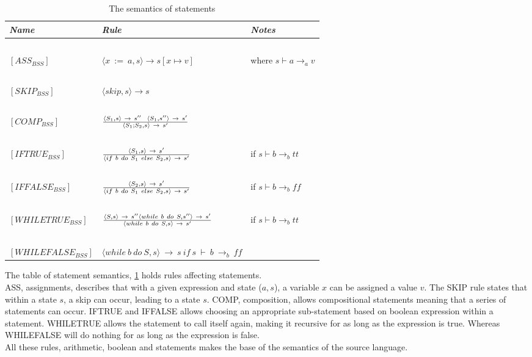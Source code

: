 \begin{table}[H]
	\begin{tabular}{|l|l|l|}
	\hline
	\emph{Name}			& \emph{Rule}																															& \emph{Notes} \\ \hline
			~			&															~																			& ~ \\
	$[ASS_{BSS}]$		& $\langle x~:=~a,s \rangle \rightarrow s[x \mapsto v]$																					& where $s \vdash a \rightarrow_{a} v$ \\
			~			&															~																			& ~ \\
	$[SKIP_{BSS}]$		& $\langle skip, s \rangle \rightarrow s$																								& ~ \\
			~			&															~																			& ~ \\
	$[COMP_{BSS}]$		& $\langle S_{1},s \rangle~\rightarrow~s''~~\langle S_{1},s'' \rangle~\rightarrow~s'  \over \langle S_{1};S_{2},s \rangle~\rightarrow~s'$	& ~ \\
			~			&															~																			& ~ \\
	$[IFTRUE_{BSS}]$	& $\langle S_{1},s \rangle~\rightarrow~s' \over \langle if~b~do~S_{1}~else~S_{2},s \rangle~\rightarrow~s'	$							& if $s \vdash b \rightarrow_{b} tt$\\
			~			&															~																			& ~ \\
	$[IFFALSE_{BSS}]$	& $\langle S_{2},s \rangle~\rightarrow~s' \over \langle if~b~do~S_{1}~else~S_{2},s \rangle~\rightarrow~s'	$							& if $s \vdash b \rightarrow_{b} ff$\\
			~			&															~																			& ~ \\
	$[WHILETRUE_{BSS}]$	& $\langle S,s \rangle~\rightarrow~s'' \langle while~b~do~S,s'' \rangle~\rightarrow~s' \over \langle while~b~do~S,s \rangle~\rightarrow~s'	$ & if $s \vdash b \rightarrow_{b} tt$\\
			~			&															~																			& ~ \\
	$[WHILEFALSE_{BSS}]$& $\langle while~b~do~S,s \rangle~\rightarrow~s~if~s~\vdash~b~\rightarrow_{b}~ff $														& ~ \\
	\hline
	\end{tabular}
	\label{tab:semantics_statements}
	\caption{The semantics of statements}
\end{table}

The table of statement semantics, \ref{tab:semantics_statements} holds rules affecting statements. \\
ASS, assignments, describes that with a given expression and state ($a, s$), a variable $x$ can be assigned a value $v$. The SKIP rule states that within a state $s$, a skip can occur, leading to a state $s$. COMP, composition, allows compositional statements meaning that a series of statements can occur. IFTRUE and IFFALSE allows choosing an appropriate sub-statement based on boolean expression within a statement. WHILETRUE allows the statement to call itself again, making it recursive for as long as the expression is true. Whereas WHILEFALSE will do nothing for as long as the expression is false.\\ 
All these rules, arithmetic, boolean and statements makes the base of the semantics of the source language.

